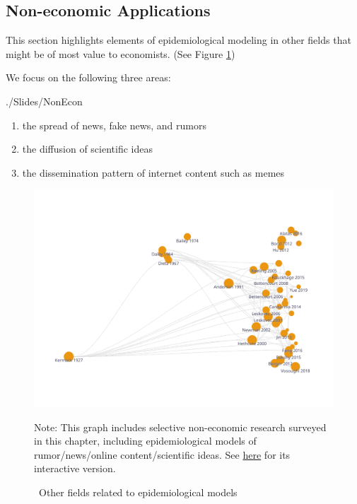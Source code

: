 \subsection{Non-economic Applications}\label{subsec:nonecon}\hypertarget{nonecon}{}

This section highlights elements of epidemiological modeling in other fields that might be of most value to economists. (See Figure \ref{fig:graph_other})


We focus on the following three areas:
\begin{verbatimwrite}{./Slides/NonEcon}
\begin{enumerate}
    \item the spread of news, fake news, and rumors
    \item the diffusion of scientific ideas
    \item the dissemination pattern of internet content such as memes
\end{enumerate}
\end{verbatimwrite}



\begin{figure}[!ht] \centering  %
	\caption{ ~Other fields related to epidemiological models}
	\label{fig:graph_other}
	\centerline{\includegraphics[width=\textwidth]{./figures/graph_other}}
	\begin{flushleft}{\footnotesize Note: This graph includes selective non-economic research surveyed in this chapter, including epidemiological models of rumor/news/online content/scientific ideas. See \href{https://app.litmaps.co/shared/07C0B3F0-B4A9-4627-923C-857F1ABFD2D3?graphConfig=%7B%22scaleMode%22%3A%22citations%22%2C%22xAxisMode%22%3A%22linear%22%2C%22yAxisMode%22%3A%22compact%22%2C%22edgeMode%22%3A%22alwaysOn%22%2C%22labelContentMode%22%3A%22author%22%2C%22graphError%22%3Anull%7D}{here} for its interactive version.}
	\end{flushleft}
\end{figure}

